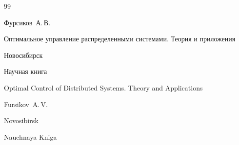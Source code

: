 \begin{thebibliography}{99}

\by Фурсиков~А.\,В.

\book Оптимальное управление распределенными системами. Теория и приложения

\publaddr Новосибирск

\publ Научная книга



\misctransl

\book Optimal Control of Distributed Systems. Theory and Applications

\by Fursikov~A.\,V.

\publaddr Novosibirsk

\publ Nauchnaya Kniga 









\end{thebibliography}



\noindent

\hskip6.5cm \thedate \par\noindent

\hskip6.5cm\therevdate





\makeengtitlem



\newpage



%

